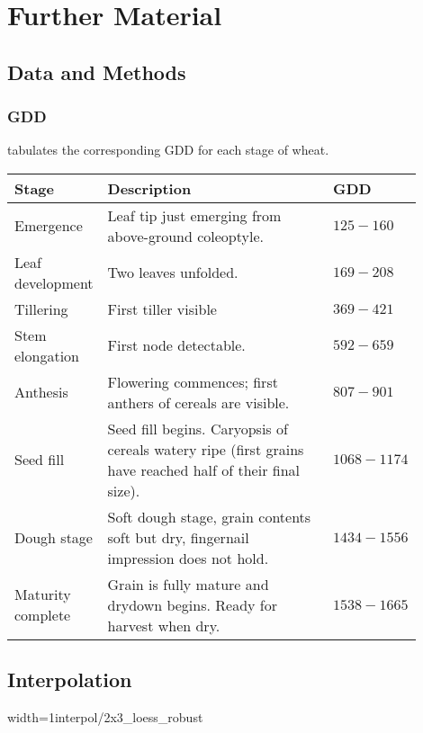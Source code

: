 \chapter{Further Material}

\section{Data and Methods}{
	\subsection{GDD}\label{app:gdd_examples}
		\cite{baileyUsingGrowingDegree2018} tabulates the corresponding GDD for each stage of wheat.
		\begin{table}[H]
			\centering
			\small
			\begin{tabular}{p{0.2\linewidth} p{0.57\linewidth}  p{0.13\linewidth}} 
				\toprule
				Stage  & Description    & GDD \\
				\hline Emergence & Leaf tip just emerging from above-ground coleoptyle. & $125-160$ \\
				\hline Leaf development & Two leaves unfolded. & $169-208$ \\
				\hline Tillering & First tiller visible  & $369-421$ \\
				\hline Stem elongation & First node detectable. & $592-659$ \\
				\hline Anthesis & Flowering commences; first anthers of cereals are visible. & $807-901$ \\
				\hline Seed fill & Seed fill begins. Caryopsis of cereals watery ripe (first grains have reached half of their final size). & $1068-1174$ \\
				\hline Dough stage & Soft dough stage, grain contents soft but dry, fingernail impression does not hold. & $1434-1556$ \\
				\hline Maturity complete & Grain is fully mature and drydown begins. Ready for harvest when dry. & $1538-1665$ \\
				\bottomrule
			\end{tabular}
		\end{table}
}


\section{Interpolation}
\begin{my_figure}[H]{width=1\textwidth}{interpol/2x3_loess_robust}
	\caption{The LOESS smoother \RobItPlot}
	\label{fig:interpol/2x3_loess_robust}
\end{my_figure}

